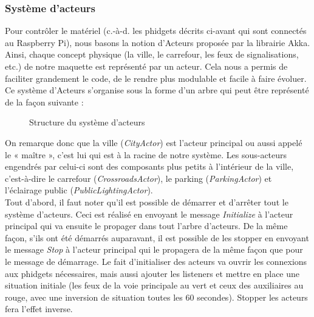 \subsubsection{Système d'acteurs}\label{systeme-acteurs}
Pour contrôler le matériel (c.-à-d. les phidgets décrits ci-avant qui sont connectés au Raspberry Pi), nous basons la notion d’Acteurs proposée par la librairie Akka. Ainsi, chaque concept physique (la ville, le carrefour, les feux de signalisations, etc.) de notre maquette est représenté par un acteur. Cela nous a permis de faciliter grandement le code, de le rendre plus modulable et facile à faire évoluer.
Ce système d’Acteurs s’organise sous la forme d’un arbre qui peut être représenté de la façon suivante :
\begin{figure}[H]
    \begin{center}

        \caption{Structure du système d'acteurs}
    \end{center}
\end{figure}
On remarque donc que la ville (\emph{CityActor}) est l’acteur principal ou aussi appelé le « maître », c’est lui qui est à la racine de notre système. Les sous-acteurs engendrés par celui-ci sont des composants plus petits à l’intérieur de la ville, c’est-à-dire le carrefour (\emph{CrossroadsActor}), le parking (\emph{ParkingActor}) et l’éclairage public (\emph{PublicLightingActor}).\\

Tout d’abord, il faut noter qu’il est possible de démarrer et d’arrêter tout le système d’acteurs. Ceci est réalisé en envoyant le message \emph{Initialize} à l’acteur principal qui va ensuite le propager dans tout l’arbre d’acteurs. De la même façon, s'ils ont été démarrés auparavant, il est possible de les stopper en envoyant le message \emph{Stop} à l’acteur principal qui le propagera de la même façon que pour le message de démarrage. Le fait d’initialiser des acteurs va ouvrir les connexions aux phidgets nécessaires, mais aussi ajouter les listeners et mettre en place une situation initiale (les feux de la voie principale au vert et ceux des auxiliaires au rouge, avec une inversion de situation toutes les 60 secondes). Stopper les acteurs fera l’effet inverse.\\

